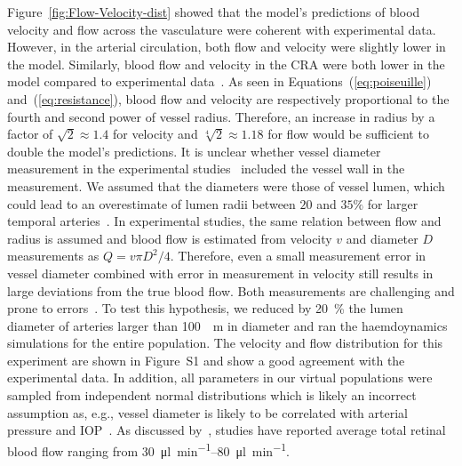 \documentclass[11pt,]{article}
\begin{document}
Figure~\ref{fig:Flow-Velocity-dist} showed that the model's predictions of blood velocity and flow across the vasculature were coherent with experimental data.
However, in the arterial circulation, both flow and velocity were slightly lower in the model\cite{Riva1985,DoblhoffDier2014}.
Similarly, blood flow and velocity in the CRA were both lower in the model compared to experimental data~\cite{DoblhoffDier2014,Riva1985,Dorner2009,Feke_1989}.
As seen in Equations~(\ref{eq:poiseuille}) and~(\ref{eq:resistance}), blood flow and velocity are respectively proportional to the fourth and second power of vessel radius.
Therefore, an increase in radius by a factor of $\sqrt{2}\approx 1.4$ for velocity and $\sqrt[4]{2}\approx 1.18$ for flow would be sufficient to double the model's predictions.
It is unclear whether vessel diameter measurement in the experimental studies~\cite{DoblhoffDier2014,Riva1985} included the vessel wall in the measurement.
We assumed that the diameters were those of vessel lumen, which could lead to an overestimate of lumen radii between $20$ and $35\%$ for larger temporal arteries~\cite{Arichika2016,Damian_2021,Meixner_2015}.
In experimental studies, the same relation between flow and radius is assumed and blood flow is estimated from velocity $v$ and diameter $D$ measurements as $Q=v\pi D^2/4$.
Therefore, even a small measurement error in vessel diameter combined with error in measurement in velocity still results in large deviations from the true blood flow.
Both measurements are challenging and prone to errors~\cite{Leitgeb_2014}.
To test this hypothesis, we reduced by \SI{20}{\percent} the lumen diameter of arteries larger than \SI{100}{\mu\metre} in diameter and ran the haemdoynamics simulations for the entire population.
The velocity and flow distribution for this experiment are shown in Figure~S1 and show a good agreement with the experimental data.
In addition, all parameters in our virtual populations were sampled from independent normal distributions which is likely an incorrect assumption as, e.g., vessel diameter is likely to be correlated with arterial pressure and IOP~\cite{Dziedziak_2022}.
As discussed by~\cite{DoblhoffDier2014}, studies have reported average total retinal blood flow ranging from \SIrange[per-mode=symbol]{30}{80}{\micro\litre\per\minute}\cite{DoblhoffDier2014,Riva1985,Feke_1989}.
\end{document}
